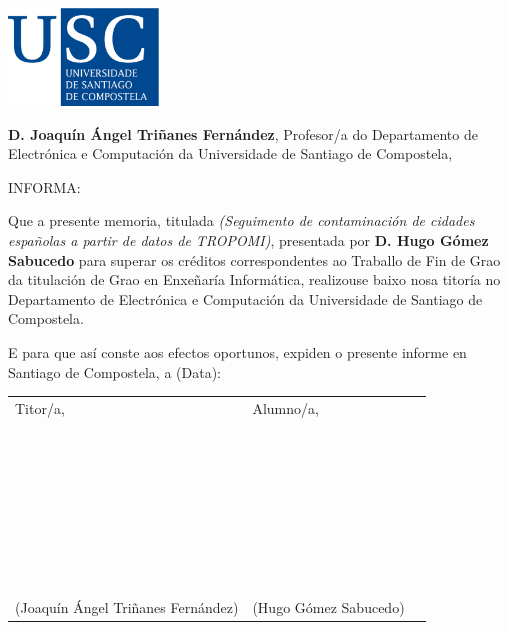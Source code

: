 \pagestyle{plain}
\includegraphics[width=4cm]{figuras/logo_usc.eps}

\vspace{1cm}
{\bf D. Joaquín Ángel Triñanes Fernández}, Profesor/a do Departamento de Electrónica e Computación da Universidade de Santiago de Compostela,

\vspace{1cm}
INFORMA:

\vspace{1cm}
Que a presente memoria, titulada {\it (Seguimento de contaminación de cidades españolas a partir de datos de TROPOMI)}, presentada por {\bf D. Hugo Gómez Sabucedo} para superar os créditos
correspondentes ao Traballo de Fin de Grao da titulación de Grao en Enxeñaría Informática, realizouse baixo nosa titoría no Departamento de Electrónica e Computación da Universidade de Santiago de Compostela.

\vspace{1cm}
E para que así conste aos efectos oportunos, expiden o presente informe en Santiago de Compostela, a (Data):

\vspace{2cm}
\begin{tabular}{lll}
	Titor/a, & Alumno/a, \\
	~ \\
	~ \\
	~ \\
	~ \\
	~ \\
	~ \\
	~ \\
	(Joaquín Ángel Triñanes Fernández) & (Hugo Gómez Sabucedo)
\end{tabular}

